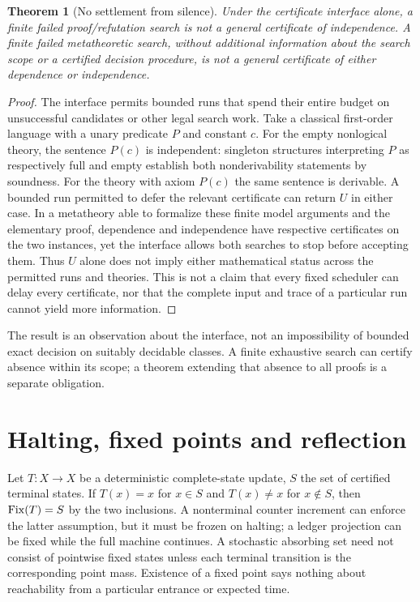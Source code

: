 \documentclass[11pt]{article}
\newtheorem{theorem}{Theorem}[section]\newtheorem{proposition}[theorem]{Proposition}\newtheorem{lemma}[theorem]{Lemma}\newtheorem{corollary}[theorem]{Corollary}
\theoremstyle{definition}\newtheorem{definition}[theorem]{Definition}\newtheorem{example}[theorem]{Example}\newtheorem{conjecture}[theorem]{Conjecture}
\begin{document}
\begin{theorem}[No settlement from silence]
Under the certificate interface alone, a finite failed proof/refutation search is not a general certificate of independence. A finite failed metatheoretic search, without additional information about the search scope or a certified decision procedure, is not a general certificate of either dependence or independence.
\end{theorem}
\begin{proof} The interface permits bounded runs that spend their entire budget on unsuccessful candidates or other legal search work. Take a classical first-order language with a unary predicate $P$ and constant $c$. For the empty nonlogical theory, the sentence $P(c)$ is independent: singleton structures interpreting $P$ as respectively full and empty establish both nonderivability statements by soundness. For the theory with axiom $P(c)$ the same sentence is derivable. A bounded run permitted to defer the relevant certificate can return $U$ in either case. In a metatheory able to formalize these finite model arguments and the elementary proof, dependence and independence have respective certificates on the two instances, yet the interface allows both searches to stop before accepting them. Thus $U$ alone does not imply either mathematical status across the permitted runs and theories. This is not a claim that every fixed scheduler can delay every certificate, nor that the complete input and trace of a particular run cannot yield more information.\end{proof}
The result is an observation about the interface, not an impossibility of bounded exact decision on suitably decidable classes. A finite exhaustive search can certify absence within its scope; a theorem extending that absence to all proofs is a separate obligation.
\section{Halting, fixed points and reflection}
Let $T:X\to X$ be a deterministic complete-state update, $S$ the set of certified terminal states. If $T(x)=x$ for $x\in S$ and $T(x)\ne x$ for $x\notin S$, then $\operatorname{Fix}(T)=S$ by the two inclusions. A nonterminal counter increment can enforce the latter assumption, but it must be frozen on halting; a ledger projection can be fixed while the full machine continues. A stochastic absorbing set need not consist of pointwise fixed states unless each terminal transition is the corresponding point mass. Existence of a fixed point says nothing about reachability from a particular entrance or expected time.
\end{document}
